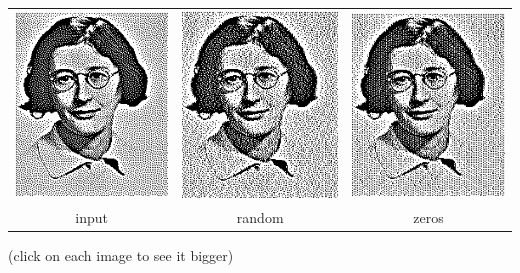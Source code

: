 \begin{tabular}{ccc}
	\href{z-psimone-retdit.png}{\includegraphics{psimone-retdit.png}}&
	\href{z-psimone-retditR.png}{\includegraphics{psimone-retditR.png}}&
	\href{z-psimone-retditZ.png}{\includegraphics{psimone-retditZ.png}}\\
	input & random & zeros
\end{tabular}
(click on each image to see it bigger)
